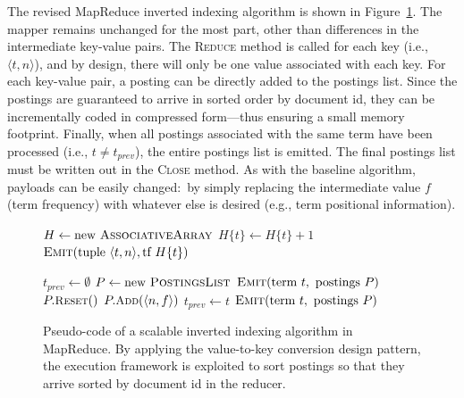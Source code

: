 The revised MapReduce inverted indexing algorithm is shown in
Figure~\ref{chapter-indexing:scalable}.  The mapper remains unchanged
for the most part, other than differences in the intermediate
key-value pairs.  The \textsc{Reduce} method is called for each key
(i.e., $\langle t, n \rangle$), and by design, there will only be one
value associated with each key.  For each key-value pair, a posting
can be directly added to the postings list.  Since the postings are
guaranteed to arrive in sorted order by document id, they can be
incrementally coded in compressed form---thus ensuring a small
memory footprint.  Finally, when all postings associated with the same
term have been processed (i.e., $t \ne t_{prev}$), the entire postings
list is emitted.  The final postings list must be written out in the
\textsc{Close} method.  As with the baseline algorithm, payloads can
be easily changed:\ by simply replacing the intermediate value $f$
(term frequency) with whatever else is desired (e.g., term positional
information).

\begin{figure}[t]
\algrenewcommand{}
\algrenewcommand{}
  \begin{algorithmic}[1]
    \State $H \gets \textrm{new }\textsc{AssociativeArray}$
    \State $H\{t\} \gets H\{t\} + 1$
    \EndFor
    \State $\textsc{Emit}(\textrm{tuple }\langle t, n \rangle, \textrm{tf }H\{t\} )$
    \EndFor
    \EndProcedure
    \EndFunction
  \end{algorithmic}

  \begin{algorithmic}[1]
      \State $t_{prev} \gets \emptyset$
      \State $P \gets \textrm{new }\textsc{PostingsList}$
    \EndProcedure
      \State $\textsc{Emit}(\textrm{term }t, \textrm{ postings } P)$
      \State $P.\textsc{{\small Reset}}()$
    \EndIf
    \State $P.\textsc{{\small Add}}(\langle n, f \rangle)$
    \State $t_{prev} \gets t$
    \EndProcedure
      \State $\textsc{Emit}(\textrm{term }t, \textrm{ postings } P)$
    \EndProcedure
    \EndFunction
  \end{algorithmic}
  \caption{Pseudo-code of a scalable inverted indexing algorithm in
    MapReduce.  By applying the value-to-key conversion design
    pattern, the execution framework is exploited to sort postings so
    that they arrive sorted by document id in the reducer.}
\label{chapter-indexing:scalable}
\end{figure}

